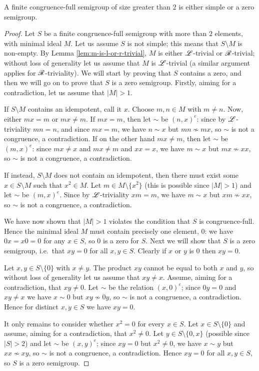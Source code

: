 \begin{lemma}
  \label{lem:simple-or-zero-semigroup}
  A finite congruence-full semigroup of size greater than $2$ is either simple
  or a zero semigroup.
  \begin{proof}
    Let $S$ be a finite congruence-full semigroup with more than $2$ elements,
    with minimal ideal $M$.  Let us assume $S$ is not simple; this means that
    $S \setminus M$ is non-empty.  By Lemma \ref{lem:m-is-l-or-r-trivial}, $M$
    is either $\mathrel{\mathscr{L}}$-trivial or $\mathrel{\mathscr{R}}$-trivial; without loss of generality let us
    assume that $M$ is $\mathrel{\mathscr{L}}$-trivial (a similar argument applies for
    $\mathrel{\mathscr{R}}$-triviality).  We will start by proving that $S$ contains a zero, and
    then we will go on to prove that $S$ is a zero semigroup.  Firstly, aiming
    for a contradiction, let us assume that $|M| > 1$.

    If $S \setminus M$ contains an idempotent, call it $x$.  Choose $m,n \in M$
    with $m \neq n$.  Now, either $mx = m$ or $mx \neq m$.  If $mx = m$, then
    let $\sim$ be $(n,x)^e$: since by $\mathrel{\mathscr{L}}$-triviality $mn = n$, and since
    $mx = m$, we have $n \sim x$ but $mn \nsim mx$, so $\sim$ is not a
    congruence, a contradiction.  If on the other hand $mx \neq m$, then let
    $\sim$ be $(m,x)^e$: since $mx \neq x$ and $mx \neq m$ and $xx=x$, we have
    $m \sim x$ but $mx \nsim xx$, so $\sim$ is not a congruence, a
    contradiction.

    If instead, $S \setminus M$ does not contain an idempotent, then there must
    exist some $x \in S \setminus M$ such that $x^2 \in M$.
    Let $m \in M \setminus \{x^2\}$ (this is possible since $|M| > 1$) and let
    $\sim$ be $(m,x)^e$.  Since by $\mathrel{\mathscr{L}}$-triviality $xm = m$, we have $m \sim x$
    but $xm \nsim xx$, so $\sim$ is not a congruence, a contradiction.

    We have now shown that $|M| > 1$ violates the condition that $S$ is
    congruence-full.  Hence the minimal ideal $M$ must contain precisely one
    element, $0$: we have $0x = x0 = 0$ for any $x \in S$, so $0$ is a zero for
    $S$. Next we will show that $S$ is a zero semigroup, i.e.~that $xy = 0$ for
    all $x,y \in S$.  Clearly if $x$ or $y$ is $0$ then $xy = 0$.

    Let $x,y \in S \setminus \{0\}$ with $x \neq y$.  The product $xy$ cannot be
    equal to both $x$ and $y$, so without loss of generality let us assume that
    $xy \neq x$.  Assume, aiming for a contradiction, that $xy \neq 0$.  Let
    $\sim$ be the relation $(x,0)^e$; since $0y = 0$ and $xy \neq x$ we have
    $x \sim 0$ but $xy \nsim 0y$, so $\sim$ is not a congruence, a
    contradiction.  Hence for distinct $x,y \in S$ we have $xy = 0$.

    It only remains to consider whether $x^2=0$ for every $x \in S$.  Let
    $x \in S \setminus \{0\}$ and assume, aiming for a contradiction, that
    $x^2 \neq 0$.  Let $y \in S \setminus \{0,x\}$ (possible since $|S| > 2$)
    and let $\sim$ be $(x,y)^e$; since $xy=0$ but $x^2 \neq 0$, we have
    $x \sim y$ but $xx \nsim xy$, so $\sim$ is not a congruence, a
    contradiction.  Hence $xy = 0$ for all $x,y \in S$, so $S$ is a zero
    semigroup.
  \end{proof}
\end{lemma}

